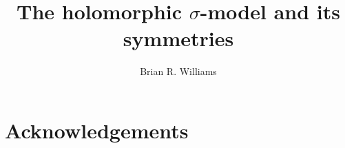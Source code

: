 \documentclass[10pt]{report}
\title{The holomorphic $\sigma$-model and its symmetries}
\author{Brian R. Williams}
\begin{document}
\maketitle

\tableofcontents

\section*{Acknowledgements} 











 


%





%  

\end{document}
